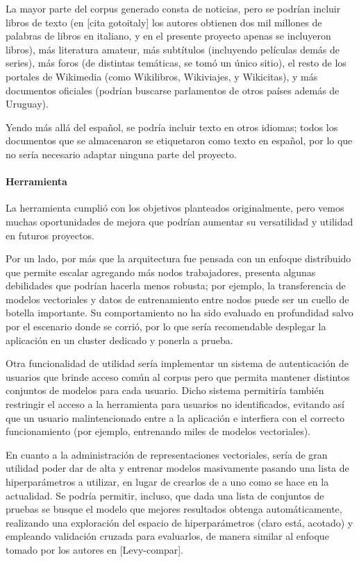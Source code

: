 La mayor parte del corpus generado consta de noticias, pero se podrían incluir libros de texto (en
[cita gotoitaly] los autores obtienen dos mil millones de palabras de libros en italiano, y en el
presente proyecto apenas se incluyeron libros), más literatura amateur, más subtítulos (incluyendo
películas demás de series), más foros (de distintas temáticas, se tomó un único sitio), el resto de
los portales de Wikimedia (como Wikilibros, Wikiviajes, y Wikicitas), y más documentos oficiales
(podrían buscarse parlamentos de otros países además de Uruguay).

Yendo más allá del español, se podría incluir texto en otros idiomas; todos los documentos que se
almacenaron se etiquetaron como texto en español, por lo que no sería necesario adaptar ninguna
parte del proyecto.


\paragraph{Herramienta}

La herramienta cumplió con los objetivos planteados originalmente, pero vemos muchas oportunidades
de mejora que podrían aumentar su versatilidad y utilidad en futuros proyectos.

Por un lado, por más que la arquitectura fue pensada con un enfoque distribuido que permite escalar
agregando más nodos trabajadores, presenta algunas debilidades que podrían hacerla menos robusta;
por ejemplo, la transferencia de modelos vectoriales y datos de entrenamiento entre nodos puede ser
un cuello de botella importante. Su comportamiento no ha sido evaluado en profundidad salvo por el
escenario donde se corrió, por lo que sería recomendable desplegar la aplicación en un cluster
dedicado y ponerla a prueba.

Otra funcionalidad de utilidad sería implementar un sistema de autenticación de usuarios que brinde
acceso común al corpus pero que permita mantener distintos conjuntos de modelos para cada
usuario. Dicho sistema permitiría también restringir el acceso a la herramienta para usuarios no
identificados, evitando así que un usuario malintencionado entre a la aplicación e interfiera con el
correcto funcionamiento (por ejemplo, entrenando miles de modelos vectoriales).

En cuanto a la administración de representaciones vectoriales, sería de gran utilidad poder dar de
alta y entrenar modelos masivamente pasando una lista de hiperparámetros a utilizar, en lugar de
crearlos de a uno como se hace en la actualidad. Se podría permitir, incluso, que dada una lista de
conjuntos de pruebas se busque el modelo que mejores resultados obtenga automáticamente, realizando
una exploración del espacio de hiperparámetros (claro está, acotado) y empleando validación cruzada
para evaluarlos, de manera similar al enfoque tomado por los autores en [Levy-compar].

